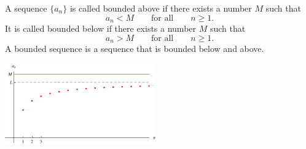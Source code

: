 \begin{frame}
\begin{definition}
A sequence $\{ a_n\}$ is called bounded above if there exists a number $M$ such that 
\[
a_n < M \qquad \textrm{for all}\qquad  n\geq 1.
\]
It is called bounded below if there exists a number $M$ such that 
\[
a_n > M \qquad \textrm{for all}\qquad  n\geq 1.
\]
A bounded sequence is a sequence that is bounded below and above.
\end{definition}
\begin{center}
\includegraphics[height=3.5cm]{sequences/pictures/12-01-bounded.pdf}%
\end{center}
\end{frame}
